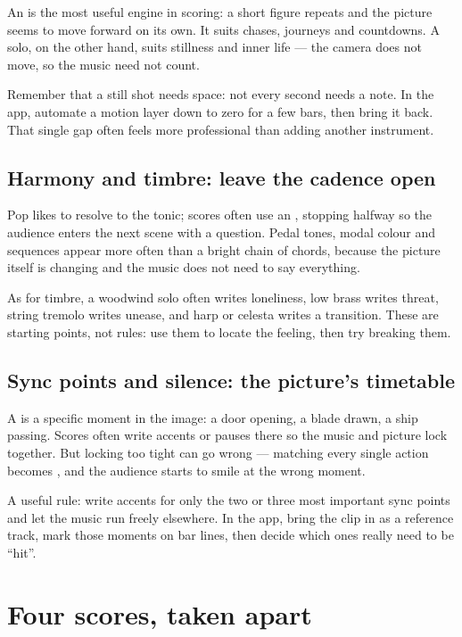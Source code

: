 An  is the most useful engine in scoring: a short figure repeats and the picture seems to move forward on its own. It suits chases, journeys and countdowns. A  solo, on the other hand, suits stillness and inner life --- the camera does not move, so the music need not count.

Remember that a still shot needs space: not every second needs a note. In the app, automate a motion layer down to zero for a few bars, then bring it back. That single gap often feels more professional than adding another instrument.

\subsection{Harmony and timbre: leave the cadence open}
\label{sec:film-harmony}

Pop likes to resolve to the tonic; scores often use an , stopping halfway so the audience enters the next scene with a question. Pedal tones, modal colour and sequences appear more often than a bright chain of chords, because the picture itself is changing and the music does not need to say everything.

As for timbre, a woodwind solo often writes loneliness, low brass writes threat, string tremolo writes unease, and harp or celesta writes a transition. These are starting points, not rules: use them to locate the feeling, then try breaking them.

\subsection{Sync points and silence: the picture's timetable}
\label{sec:film-sync}

A  is a specific moment in the image: a door opening, a blade drawn, a ship passing. Scores often write accents or pauses there so the music and picture lock together. But locking too tight can go wrong --- matching every single action becomes , and the audience starts to smile at the wrong moment.

A useful rule: write accents for only the two or three most important sync points and let the music run freely elsewhere. In the app, bring the clip in as a reference track, mark those moments on bar lines, then decide which ones really need to be ``hit''.

\section{Four scores, taken apart}
\label{sec:film-cases}

